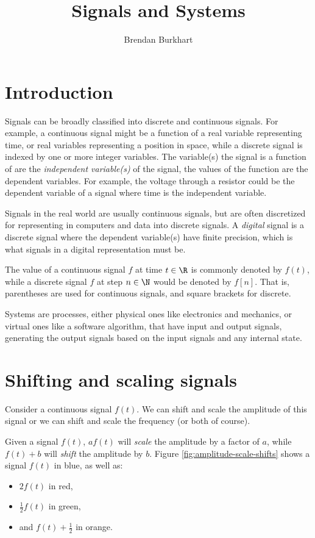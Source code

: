 \documentclass[12pt]{article}
\begin{document}
\title{Signals and Systems}
\author{Brendan Burkhart}
\maketitle

\tableofcontents
\newpage

\section{Introduction}

Signals can be broadly classified into discrete and continuous signals. For example, a continuous signal might be a function of a real variable representing time, or real variables representing a position in space, while a discrete signal is indexed by one or more integer variables. The variable(s) the signal is a function of are the \emph{independent variable(s)} of the signal, the values of the function are the dependent variables. For example, the voltage through a resistor could be the dependent variable of a signal where time is the independent variable.

Signals in the real world are usually continuous signals, but are often discretized for representing in computers and data into discrete signals. A \emph{digital} signal is a discrete signal where the dependent variable(s) have finite precision, which is what signals in a digital representation must be.

The value of a continuous signal $f$ at time $t \in \R$ is commonly denoted by $f(t)$, while a discrete signal $f$ at step $n \in \N$ would be denoted by $f[n]$. That is, parentheses are used for continuous signals, and square brackets for discrete.

Systems are processes, either physical ones like electronics and mechanics, or virtual ones like a software algorithm, that have input and output signals, generating the output signals based on the input signals and any internal state.

\section{Shifting and scaling signals}

Consider a continuous signal $f(t)$. We can shift and scale the amplitude of this signal or we can shift and scale the frequency (or both of course).

Given a signal $f(t)$, $af(t)$ will \emph{scale} the amplitude by a factor of $a$, while $f(t) + b$ will \emph{shift} the amplitude by $b$. Figure \ref{fig:amplitude-scale-shifts} shows a signal $f(t)$ in blue, as well as:
\begin{itemize}
    \item $2f(t)$ in red,
    \item $\frac{1}{2}f(t)$ in green,
    \item and $f(t) + \frac{1}{2}$ in orange.
\end{itemize}
\end{document}
